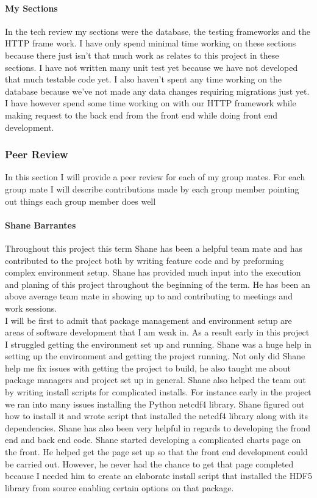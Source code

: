 \documentclass[onecolumn, draftclsnofoot,10pt, compsoc]{article}
\begin{document}
		\paragraph{My Sections} \hfill \break
		In the tech review my sections were the database, the testing frameworks and the HTTP frame work. I have only spend minimal time working on these sections because there just isn't that much work as relates to this project in these sections. I have not written many unit test yet because we have not developed that much testable code yet. I also haven’t spent any time working on the database because we've not made any data changes requiring migrations just yet. I have however spend some time working on with our HTTP framework while making request to the back end from the front end while doing front end development.\\
	
	\subsubsection{Peer Review}
		In this section I will provide a peer review for each of my group mates. For each group mate I will describe contributions made by each group member pointing out things each group member does well 
		\paragraph{Shane Barrantes} \hfill \break
			Throughout this project this term Shane has been a helpful team mate and has contributed to the project both by writing feature code and by preforming complex environment setup. Shane has provided much input into the execution and planing of this project throughout the beginning of the term. He has been an above average team mate in showing up to and contributing to meetings and work sessions.\\ 
			
			I will be first to admit that package management and environment setup are areas of software development that I am weak in. As a result early in this project I struggled getting the environment set up and running. Shane was a huge help in setting up the environment and getting the project running. Not only did Shane help me fix issues with getting the project to build, he also taught me about package managers and project set up in general. Shane also helped the team out by writing install scripts for complicated installs. For instance early in the project we ran into many issues installing the Python netcdf4 library. Shane figured out how to install it and wrote script that installed the netcdf4 library along with its dependencies. Shane has also been very helpful in regards to developing the frond end and back end code. Shane started developing a complicated charts page on the front. He helped get the page set up so that the front end development could be carried out. However, he never had the chance to get that page completed because I needed him to create an elaborate install script that installed the HDF5 library from source enabling certain options on that package.\\
			
\end{document}
